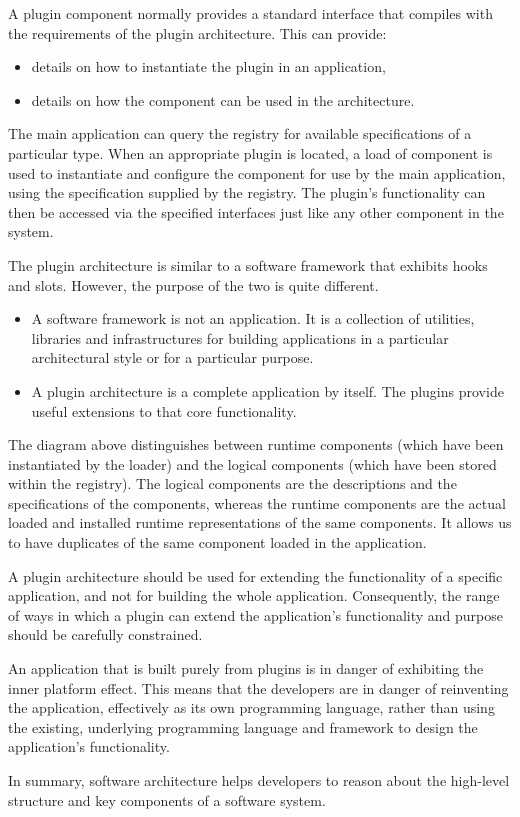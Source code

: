 \documentclass[a4paper, openany]{memoir}
\begin{document}
A plugin component normally provides a standard interface that compiles with the requirements of the plugin architecture. This can provide:
\begin{itemize}
    \item details on how to instantiate the plugin in an application,
    \item details on how the component can be used in the architecture.
\end{itemize}
The main application can query the registry for available specifications of a particular type. When an appropriate plugin is located, a load of component is used to instantiate and configure the component for use by the main application, using the specification supplied by the registry. The plugin's functionality can then be accessed via the specified interfaces just like any other component in the system.

The plugin architecture is similar to a software framework that exhibits hooks and slots. However, the purpose of the two is quite different. 
\begin{itemize}
    \item A software framework is not an application. It is a collection of utilities, libraries and infrastructures for building applications in a particular architectural style or for a particular purpose.
    \item A plugin architecture is a complete application by itself. The plugins provide useful extensions to that core functionality.
\end{itemize}

The diagram above distinguishes between runtime components (which have been instantiated by the loader) and the logical components (which have been stored within the registry). The logical components are the descriptions and the specifications of the components, whereas the runtime components are the actual loaded and installed runtime representations of the same components. It allows us to have duplicates of the same component loaded in the application.

A plugin architecture should be used for extending the functionality of a specific application, and not for building the whole application. Consequently, the range of ways in which a plugin can extend the application's functionality and purpose should be carefully constrained. 

An application that is built purely from plugins is in danger of exhibiting the inner platform effect. This means that the developers are in danger of reinventing the application, effectively as its own programming language, rather than using the existing, underlying programming language and framework to design the application's functionality.

In summary, software architecture helps developers to reason about the high-level structure and key components of a software system.
\end{document}
